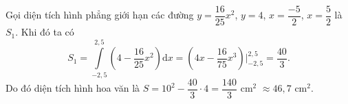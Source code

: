 \begin{ex}
{{
		}
	\noindent
		Gọi diện tích hình phẳng giới hạn các đường $y=\dfrac{16}{25}x^2$, $y=4$, $x=\dfrac{-5}{2}$, $x=\dfrac{5}{2}$ là $S_1$. Khi đó ta có $$S_1=\displaystyle\int\limits_{-2{,}5}^{2{,}5} \left(4-\dfrac{16}{25}x^2\right)\mathrm{d}x=\left(4x-\dfrac{16}{75}x^3\right)\bigg|_{-2{,}5}^{2{,}5}=\dfrac{40}{3}.$$
		Do đó diện tích hình hoa văn là $S=10^2-\dfrac{40}{3} \cdot 4=\dfrac{140}{3}$ cm$^2$ $\approx 46{,}7$ cm$^2$. }
\end{ex}
